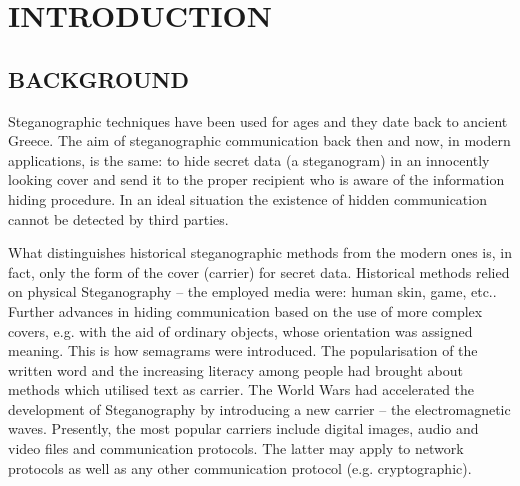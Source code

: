 \documentclass[12pt]{extreport}
\begin{document}
\begin{titlepage}

\end{titlepage}

\setcounter{page}{2}





\newpage
\pagestyle{fancy}
\setcounter{page}{4}
\fancyhf{}
\fancyhead[LE,RO]{\textit{\leftmark}}
\fancyhead[RE,LO]{\LaTeX}
\fancyfoot[LE,RO]{\thepage}
 
\renewcommand{\headrulewidth}{2pt}
\renewcommand{\footrulewidth}{1pt}
\newpage

\listoffigures
\newpage
\listoftables
\newpage
\tableofcontents

\chapter{INTRODUCTION}
\setcounter{page}{1}
\section{BACKGROUND}
\hspace*{5em}Steganographic techniques have been used for ages and they date back to ancient Greece. The aim of steganographic communication back then and now, in modern applications, is the same: to hide secret data (a steganogram) in an innocently looking cover and send it to the proper recipient who is aware of the information hiding procedure. In an ideal situation the existence of hidden communication cannot be detected by third parties.

What distinguishes historical steganographic methods from the modern ones is, in fact, only the form of the cover (carrier) for secret data. Historical methods relied on physical Steganography – the employed media were: human skin, game, etc.. Further advances in hiding communication based on the use of more complex covers, e.g. with the aid of ordinary objects, whose orientation was assigned meaning. This is how semagrams were introduced. The popularisation of the written word and the increasing literacy among people had brought about methods which utilised text as carrier. The World Wars had accelerated the development of Steganography by introducing a new carrier – the electromagnetic waves. Presently, the most popular carriers include digital images, audio and video files and communication protocols. The latter may apply to network protocols as well as any other communication protocol (e.g. cryptographic).
\end{document}
